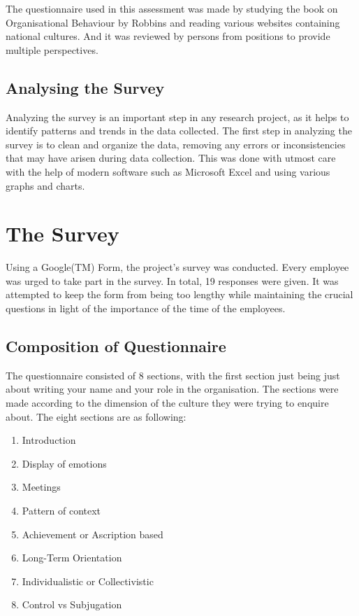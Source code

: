 \documentclass{article}
\begin{document}
The questionnaire used in this assessment was made by studying the book on Organisational Behaviour by Robbins and reading various websites containing national cultures. And it was reviewed by persons from positions to provide multiple perspectives.

\subsection{Analysing the Survey}

Analyzing the survey is an important step in any research project, as it helps to identify patterns and trends in the data collected. The first step in analyzing the survey is to clean and organize the data, removing any errors or inconsistencies that may have arisen during data collection. This was done with utmost care with the help of modern software such as Microsoft Excel and using various graphs and charts.

\section{The Survey}

Using a Google(TM) Form, the project's survey was conducted. Every employee was urged to take part in the survey. In total, 19 responses were given. It was attempted to keep the form from being too lengthy while maintaining the crucial questions in light of the importance of the time of the employees.

\subsection*{Composition of Questionnaire}

The questionnaire consisted of 8 sections, with the first section just being just about writing your name and your role in the organisation. The sections were made according to the dimension of the culture they were trying to enquire about. The eight sections are as following:

\begin{enumerate}
    \item Introduction
    \item Display of emotions
    \item Meetings
    \item Pattern of context
    \item Achievement or Ascription based
    \item Long-Term Orientation
    \item Individualistic or Collectivistic
    \item Control vs Subjugation
\end{enumerate}
\end{document}
